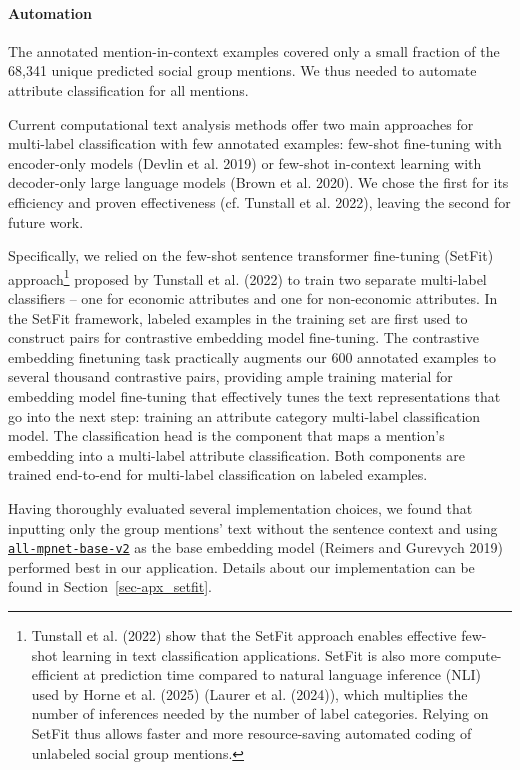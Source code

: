 \documentclass[12pt]{article}
\begin{document}
\paragraph{Automation}\label{automation}

The annotated mention-in-context examples covered only a small fraction of the 68,341 unique predicted social group mentions.
We thus needed to automate attribute classification for all mentions.

Current computational text analysis methods offer two main approaches for multi-label classification with few annotated examples: few-shot fine-tuning with encoder-only models (Devlin et al. 2019) or few-shot in-context learning with decoder-only large language models (Brown et al. 2020).
We chose the first for its efficiency and proven effectiveness (cf. Tunstall et al. 2022), leaving the second for future work.

Specifically, we relied on the few-shot sentence transformer fine-tuning (SetFit) approach\footnote{Tunstall et al. (2022) show that the SetFit approach enables effective few-shot learning in text classification applications.
  SetFit is also more compute-efficient at prediction time compared to natural language inference (NLI) used by Horne et al. (2025) (Laurer et al. (2024)), which multiplies the number of inferences needed by the number of label categories.
  Relying on SetFit thus allows faster and more resource-saving automated coding of unlabeled social group mentions.} proposed by Tunstall et al. (2022) to train two separate multi-label classifiers -- one for economic attributes and one for non-economic attributes.
In the SetFit framework, labeled examples in the training set are first used to construct pairs for contrastive embedding model fine-tuning.
The contrastive embedding finetuning task practically augments our 600 annotated examples to several thousand contrastive pairs, providing ample training material for embedding model fine-tuning that effectively tunes the text representations that go into the next step: training an attribute category multi-label classification model.
The classification head is the component that maps a mention's embedding into a multi-label attribute classification.
Both components are trained end-to-end for multi-label classification on labeled examples.

Having thoroughly evaluated several implementation choices, we found that inputting only the group mentions' text without the sentence context and using \href{https://huggingface.co/sentence-transformers/all-mpnet-base-v2}{\texttt{all-mpnet-base-v2}} as the base embedding model (Reimers and Gurevych 2019) performed best in our application.
Details about our implementation can be found in Section~\ref{sec-apx_setfit}.
\end{document}
